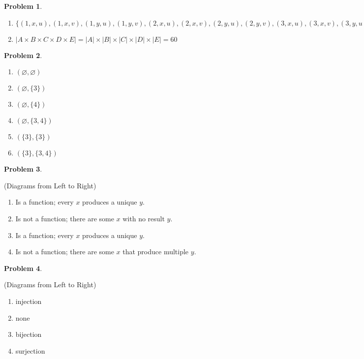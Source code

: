 \documentclass[11pt]{article}
\theoremstyle{definition}
\theoremstyle{case}
\theoremstyle{theorem}
\newtheorem{prob}{Problem}
\begin{document}
\begin{prob}\end{prob}
\begin{enumerate}[label=(\alph*)]
\item
$\{(1, x, u), (1, x, v), (1, y, u), (1, y, v), (2, x, u), (2, x, v), (2, y, u), (2, y, v), (3, x, u), (3, x, v), (3, y, u), (3, y, v)\}$

\item
$|A \times B \times C \times D \times E| = |A| \times |B| \times |C| \times |D| \times |E| = 60$
\end{enumerate}

\newpage

\begin{prob}\end{prob}
\begin{enumerate}
\item
$(\varnothing, \varnothing)$
\item
$(\varnothing, \{ 3 \})$
\item
$(\varnothing, \{ 4 \})$
\item
$(\varnothing, \{ 3, 4 \})$
\item
$(\{ 3 \}, \{ 3 \})$
\item
$(\{ 3 \}, \{ 3, 4 \})$
\end{enumerate}

\begin{prob}\end{prob}
(Diagrams from Left to Right)
\begin{enumerate}
\item
Is a function; every $x$ produces a unique $y$.
\item
Is not a function; there are some $x$ with no result $y$.
\item
Is a function; every $x$ produces a unique $y$.
\item
Is not a function; there are some $x$ that produce multiple $y$.
\end{enumerate}

\begin{prob}\end{prob}
(Diagrams from Left to Right)
\begin{enumerate}
\item
injection
\item
none
\item
bijection
\item
surjection
\end{enumerate}
\end{document}
